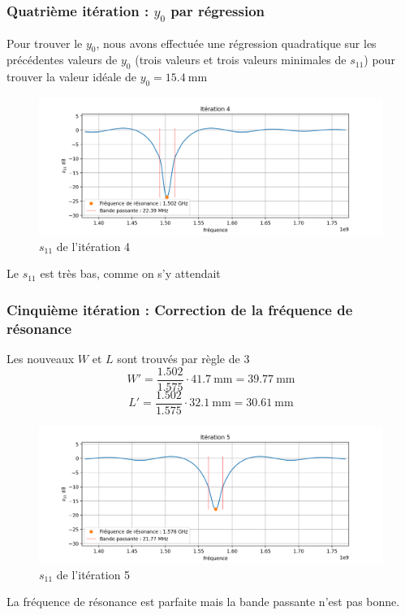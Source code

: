 \documentclass[Deriaz_Traiber_Labo02.tex]{subfiles}
\begin{document}
\subsubsection{Quatrième itération : $y_0$ par régression}
Pour trouver le $y_0$, nous avons effectuée une régression quadratique sur les précédentes valeurs de $y_0$ (trois valeurs et trois valeurs minimales de $s_{11}$) pour trouver la valeur idéale de $y_0=\SI{15.4}{\milli\meter}$
\begin{figure}[H]
\centering
\includegraphics[width=15cm]{../Calculs/run_id_ceramique_4.png}
\caption[caption]{$s_{11}$ de l'itération 4}
\end{figure}
Le $s_{11}$ est très bas, comme on s'y attendait
\subsubsection{Cinquième itération : Correction de la fréquence de résonance}
Les nouveaux $W$ et $L$ sont trouvés par règle de 3
$$W'=\frac{1.502}{1.575}\cdot \SI{41.7}{\milli\meter}=\SI{39.77}{\milli\meter}$$
$$L'=\frac{1.502}{1.575}\cdot \SI{32.1}{\milli\meter}=\SI{30.61}{\milli\meter}$$
\begin{figure}[H]
\centering
\includegraphics[width=15cm]{../Calculs/run_id_ceramique_5.png}
\caption[caption]{$s_{11}$ de l'itération 5}
\end{figure}
La fréquence de résonance est parfaite mais la bande passante n'est pas bonne.
\end{document}
